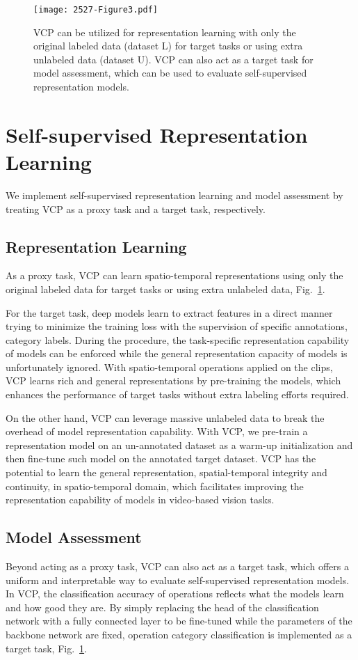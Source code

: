 \documentclass[letterpaper]{article}
\begin{document}
\begin{figure}[t]
     \centering
     \texttt{[image: 2527-Figure3.pdf]}
     \caption{VCP can be utilized for representation learning with only the original labeled data (dataset L) for target tasks or using extra unlabeled data (dataset U). VCP can also act as a target task for model assessment, which can be used to evaluate self-supervised representation models. }
     \label{fig:VCPusage}
 \end{figure}
\section{Self-supervised Representation Learning}
We implement self-supervised representation learning and model assessment by treating VCP as a proxy task and a target task, respectively.

\subsection{Representation Learning} 


As a proxy task, VCP can learn spatio-temporal representations using only the original labeled data for target tasks or using extra unlabeled data, Fig.\ \ref{fig:VCPusage}.

For the target task, deep models learn to extract features in a direct manner trying to minimize the training loss with the supervision of specific annotations,  category labels. During the procedure, the task-specific representation capability of models can be enforced while the general representation capacity of models is unfortunately ignored. With spatio-temporal operations applied on the clips, VCP learns rich and general representations by pre-training the models, which enhances the performance of target tasks without extra labeling efforts required. 

On the other hand, VCP can leverage massive unlabeled data to break the overhead of model representation capability. With VCP, we pre-train a representation model on an un-annotated dataset as a warm-up initialization and then fine-tune such model on the annotated target dataset. VCP has the potential to learn the general representation,  spatial-temporal integrity and continuity, in spatio-temporal domain, which facilitates improving the representation capability of models in video-based vision tasks. 

\subsection{Model Assessment} 
Beyond acting as a proxy task, VCP can also act as a target task, which offers a uniform and interpretable way to evaluate self-supervised representation models. In VCP, the classification accuracy of operations reflects what the models learn and how good they are. By simply replacing the head of the classification network with a fully connected layer to be fine-tuned while the parameters of the backbone network are fixed, operation category classification is implemented as a target task, Fig.\ \ref{fig:VCPusage}. 
\end{document}
